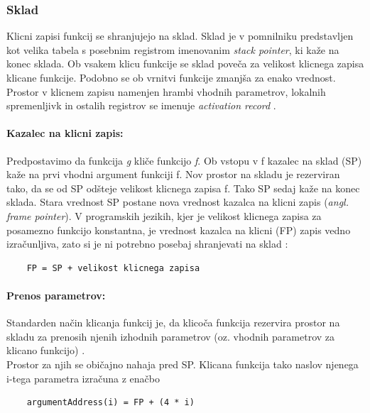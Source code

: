 \documentclass[a4paper, 12p]{book}
\begin{document}
\subsubsection{Sklad}

Klicni zapisi funkcij se shranjujejo na sklad. Sklad je v pomnilniku predstavljen kot velika tabela s posebnim registrom imenovanim \textit{stack pointer}, ki kaže na konec sklada. Ob vsakem klicu funkcije se sklad poveča za velikost klicnega zapisa klicane funkcije. Podobno se ob vrnitvi funkcije zmanjša za enako vrednost. Prostor v klicnem zapisu namenjen hrambi vhodnih parametrov, lokalnih spremenljivk in ostalih registrov se imenuje \textit{activation record} \cite{modernCompiler}. 

\paragraph{Kazalec na klicni zapis:}

Predpostavimo da funkcija \textit{g} kliče funkcijo \textit{f}. Ob vstopu v f kazalec na sklad (SP) kaže na prvi vhodni argument funkciji f. Nov prostor na skladu je rezerviran tako, da se od SP odšteje velikost klicnega zapisa f. Tako SP sedaj kaže na konec sklada. Stara vrednost SP postane nova vrednost kazalca na klicni zapis (\textit{angl. frame pointer}). V programskih jezikih, kjer je velikost klicnega zapisa za posamezno funkcijo konstantna, je vrednost kazalca na klicni (FP) zapis vedno izračunljiva, zato si je ni potrebno posebaj shranjevati na sklad \cite{modernCompiler}: 

\begin{lstlisting}
	FP = SP + velikost klicnega zapisa
\end{lstlisting}

\paragraph{Prenos parametrov:}

Standarden način klicanja funkcij je, da klicoča funkcija rezervira prostor na skladu za prenosih njenih izhodnih parametrov (oz. vhodnih parametrov za klicano funkcijo) \cite{modernCompiler}. \\ 
\indent Prostor za njih se običajno nahaja pred SP. Klicana funkcija tako naslov njenega i-tega parametra izračuna z enačbo \\
\begin{lstlisting}
	argumentAddress(i) = FP + (4 * i)
\end{lstlisting}
\end{document}
